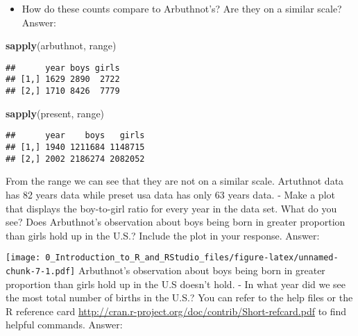 \documentclass[]{article}
\newenvironment{Shaded}{\begin{snugshade}}{\end{snugshade}}
\newcommand{\KeywordTok}[1]{\textcolor[rgb]{0.13,0.29,0.53}{\textbf{#1}}}
\newcommand{\DataTypeTok}[1]{\textcolor[rgb]{0.13,0.29,0.53}{#1}}
\newcommand{\StringTok}[1]{\textcolor[rgb]{0.31,0.60,0.02}{#1}}
\newcommand{\OperatorTok}[1]{\textcolor[rgb]{0.81,0.36,0.00}{\textbf{#1}}}
\newcommand{\NormalTok}[1]{#1}
\providecommand{\tightlist}{%
  \setlength{\itemsep}{0pt}\setlength{\parskip}{0pt}}
\begin{document}
\begin{itemize}
\tightlist
\item
  How do these counts compare to Arbuthnot's? Are they on a similar
  scale? Answer:
\end{itemize}

\begin{Shaded}
\begin{Highlighting}[]
\KeywordTok{sapply}\NormalTok{(arbuthnot, range)}
\end{Highlighting}
\end{Shaded}

\begin{verbatim}
##      year boys girls
## [1,] 1629 2890  2722
## [2,] 1710 8426  7779
\end{verbatim}

\begin{Shaded}
\begin{Highlighting}[]
\KeywordTok{sapply}\NormalTok{(present, range)}
\end{Highlighting}
\end{Shaded}

\begin{verbatim}
##      year    boys   girls
## [1,] 1940 1211684 1148715
## [2,] 2002 2186274 2082052
\end{verbatim}

From the range we can see that they are not on a similar scale.
Artuthnot data has 82 years data while preset usa data has only 63 years
data. - Make a plot that displays the boy-to-girl ratio for every year
in the data set. What do you see? Does Arbuthnot's observation about
boys being born in greater proportion than girls hold up in the U.S.?
Include the plot in your response. Answer:

\begin{Shaded}
\end{Shaded}

\texttt{[image: 0\_Introduction\_to\_R\_and\_RStudio\_files/figure-latex/unnamed-chunk-7-1.pdf]}
Arbuthnot's observation about boys being born in greater proportion than
girls hold up in the U.S doesn't hold. - In what year did we see the
most total number of births in the U.S.? You can refer to the help files
or the R reference card
\url{http://cran.r-project.org/doc/contrib/Short-refcard.pdf} to find
helpful commands. Answer:
\end{document}
